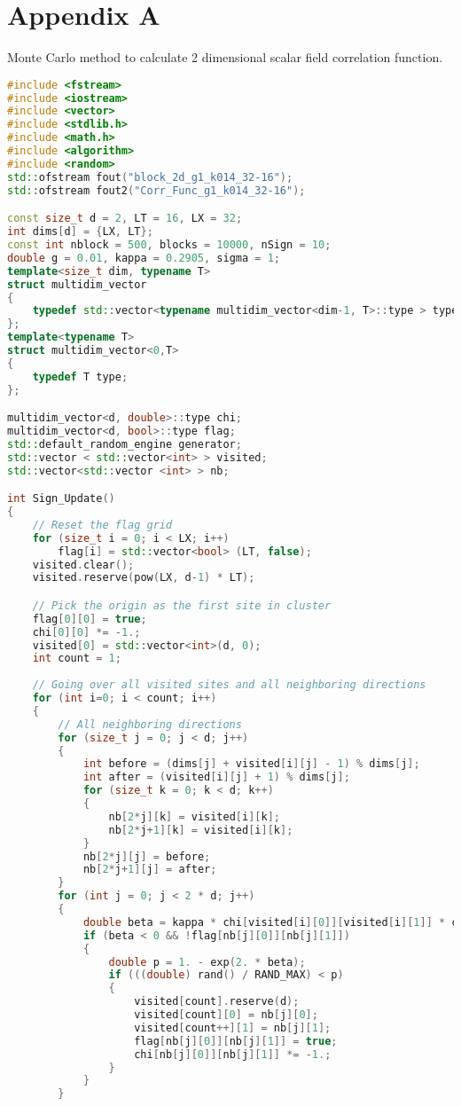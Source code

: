 \documentclass[12pt]{article}
\begin{document}
\section*{Appendix A}
Monte Carlo method to calculate 2 dimensional scalar field correlation function. \\
\begin{lstlisting}[language=C++]
#include <fstream> 
#include <iostream>
#include <vector>
#include <stdlib.h>
#include <math.h>
#include <algorithm>
#include <random>
std::ofstream fout("block_2d_g1_k014_32-16"); 
std::ofstream fout2("Corr_Func_g1_k014_32-16"); 

const size_t d = 2, LT = 16, LX = 32; 
int dims[d] = {LX, LT}; 
const int nblock = 500, blocks = 10000, nSign = 10; 
double g = 0.01, kappa = 0.2905, sigma = 1; 
template<size_t dim, typename T>
struct multidim_vector
{
	typedef std::vector<typename multidim_vector<dim-1, T>::type > type; 
}; 
template<typename T>
struct multidim_vector<0,T>
{
	typedef T type; 
};

multidim_vector<d, double>::type chi; 
multidim_vector<d, bool>::type flag; 
std::default_random_engine generator; 
std::vector < std::vector<int> > visited; 
std::vector<std::vector <int> > nb; 

int Sign_Update()
{
	// Reset the flag grid
	for (size_t i = 0; i < LX; i++)
		flag[i] = std::vector<bool> (LT, false); 
	visited.clear(); 
	visited.reserve(pow(LX, d-1) * LT); 

	// Pick the origin as the first site in cluster
	flag[0][0] = true; 
	chi[0][0] *= -1.; 
	visited[0] = std::vector<int>(d, 0); 
	int count = 1; 
	
	// Going over all visited sites and all neighboring directions
	for (int i=0; i < count; i++)
	{
		// All neighboring directions
		for (size_t j = 0; j < d; j++)
		{
			int before = (dims[j] + visited[i][j] - 1) % dims[j]; 
			int after = (visited[i][j] + 1) % dims[j]; 
			for (size_t k = 0; k < d; k++)
			{
				nb[2*j][k] = visited[i][k]; 
				nb[2*j+1][k] = visited[i][k]; 
			}
			nb[2*j][j] = before; 
			nb[2*j+1][j] = after; 
		}
		for (int j = 0; j < 2 * d; j++)
		{
			double beta = kappa * chi[visited[i][0]][visited[i][1]] * chi[nb[j][0]][nb[j][1]]; 
			if (beta < 0 && !flag[nb[j][0]][nb[j][1]])
			{
				double p = 1. - exp(2. * beta); 
				if (((double) rand() / RAND_MAX) < p)
				{
					visited[count].reserve(d); 
					visited[count][0] = nb[j][0]; 
					visited[count++][1] = nb[j][1]; 
					flag[nb[j][0]][nb[j][1]] = true; 
					chi[nb[j][0]][nb[j][1]] *= -1.; 
				}
			}
		}


\end{lstlisting}
\end{document}

